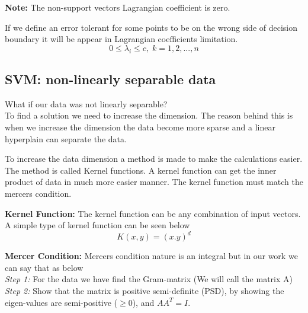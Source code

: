 \documentclass{article}
\begin{document}
\textbf{Note:} The non-support vectors Lagrangian coefficient is zero. \par
If we define an error tolerant for some points to be on the wrong side of decision boundary it will be appear in Lagrangian coefficients limitation.
\begin{equation}
       0 \leq \lambda_i \leq c, \; k = 1,2,...,n
\end{equation}

\subsection{SVM: non-linearly separable data}
What if our data was not linearly separable? \\ To find a solution we need to increase the dimension. The reason behind this is when we increase the dimension the data become more sparse and a linear hyperplain can separate the data. \par
To increase the data dimension a method is made to make the calculations easier. The method is called Kernel functions. A kernel function can get the inner product of data in much more easier manner. The kernel function must match the mercers condition. \par
\textbf{Kernel Function:} The kernel function can be any combination of input vectors. A simple type of kernel function can be seen below
\begin{equation}
    K(x,y) = (x.y)^d
\end{equation} \par
\textbf{Mercer Condition:} Mercers condition nature is an integral but in our work we can say that as below \\
\textit{Step 1:} For the data we have find the Gram-matrix (We will call the matrix A)\\
\textit{Step 2:} Show that the matrix is positive semi-definite (PSD), by showing the eigen-values are semi-positive ($\geq 0$), and $ A A^T = I$.
\end{document}
